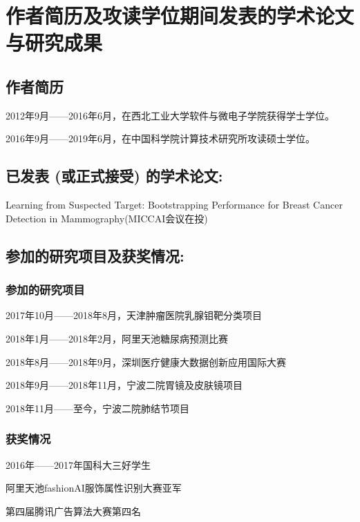 \chapter{作者简历及攻读学位期间发表的学术论文与研究成果}

\section*{作者简历}

2012年9月——2016年6月，在西北工业大学软件与微电子学院获得学士学位。


2016年9月——2019年6月，在中国科学院计算技术研究所攻读硕士学位。

\section*{已发表 (或正式接受) 的学术论文:}
Learning from Suspected Target: Bootstrapping Performance for Breast Cancer Detection in Mammography(MICCAI会议在投)

\section*{参加的研究项目及获奖情况:}

\subsection{参加的研究项目}
2017年10月——2018年8月，天津肿瘤医院乳腺钼靶分类项目

2018年1月——2018年2月，阿里天池糖尿病预测比赛

2018年8月——2018年9月，深圳医疗健康大数据创新应用国际大赛

2018年9月——2018年11月，宁波二院胃镜及皮肤镜项目

2018年11月——至今，宁波二院肺结节项目

\subsection{获奖情况}
2016年——2017年国科大三好学生

阿里天池fashionAI服饰属性识别大赛亚军

第四届腾讯广告算法大赛第四名




\cleardoublepage[plain]%

